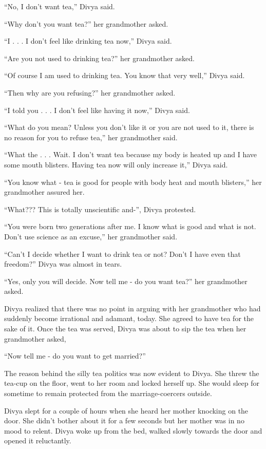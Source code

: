 “No, I don't want tea,” Divya said.

“Why don't you want tea?” her grandmother asked.

“I . . . I don't feel like drinking tea now,” Divya said.

“Are you not used to drinking tea?” her grandmother asked.

“Of course I am used to drinking tea. You know that very well,” Divya said.

“Then why are you refusing?” her grandmother asked.

“I told you . . . I don't feel like having it now,” Divya said.

“What do you mean? Unless you don't like it or you are not used to it, there is
no reason for you to refuse tea,” her grandmother said.

“What the . . . Wait. I don't want tea because my body is heated up and I have
some mouth blisters. Having tea now will only increase it,” Divya said.

“You know what - tea is good for people with body heat and mouth blisters,” her
grandmother assured her.

“What??? This is totally unscientific and-”, Divya protested.

“You were born two generations after me. I know what is good and what is not.
Don't use science as an excuse,” her grandmother said.

“Can't I decide whether I want to drink tea or not? Don't I have even that
freedom?” Divya was almost in tears.

“Yes, only you will decide. Now tell me - do you want tea?” her grandmother
asked.

Divya realized that there was no point in arguing with her grandmother who had
suddenly become irrational and adamant, today. She agreed to have tea for the
sake of it. Once the tea was served, Divya was about to sip the tea when her
grandmother asked,

“Now tell me - do you want to get married?”

The reason behind the silly tea politics was now evident to Divya. She threw the
tea-cup on the floor, went to her room and locked herself up. She would sleep
for sometime to remain protected from the marriage-coercers outside.

Divya slept for a couple of hours when she heard her mother knocking on the
door. She didn't bother about it for a few seconds but her mother was in no mood
to relent. Divya woke up from the bed, walked slowly towards the door and opened
it reluctantly.

